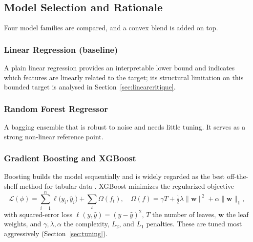 \documentclass[journal]{IEEEtran}
\begin{document}
\subsection{Model Selection and Rationale}
Four model families are compared, and a convex blend is added on top.

\subsubsection{Linear Regression (baseline)}
A plain linear regression provides an interpretable lower bound and indicates which
features are linearly related to the target; its structural limitation on this
bounded target is analysed in Section~\ref{sec:linearcritique}.

\subsubsection{Random Forest Regressor}
A bagging ensemble \cite{breiman1996,breiman2001} that is robust to noise and
needs little tuning. It serves as a strong non-linear reference point.

\subsubsection{Gradient Boosting and XGBoost}
Boosting builds the model sequentially and is widely regarded as the best
off-the-shelf method for tabular data \cite{friedman2001,chen2016xgboost}.
XGBoost minimizes the regularized objective
\begin{equation}
\mathcal{L}(\phi)=\sum_{i=1}^{n}\ell\!\big(y_i,\hat y_i\big)
+\sum_{t}\Omega(f_t),\quad
\Omega(f)=\gamma T+\tfrac{1}{2}\lambda\lVert\mathbf{w}\rVert^{2}
+\alpha\lVert\mathbf{w}\rVert_{1},
\label{eq:xgbobj}
\end{equation}
with squared-error loss $\ell(y,\hat y)=(y-\hat y)^2$, $T$ the number of leaves,
$\mathbf{w}$ the leaf weights, and $\gamma,\lambda,\alpha$ the complexity,
$L_2$, and $L_1$ penalties. These are tuned most aggressively
(Section~\ref{sec:tuning}).
\end{document}
